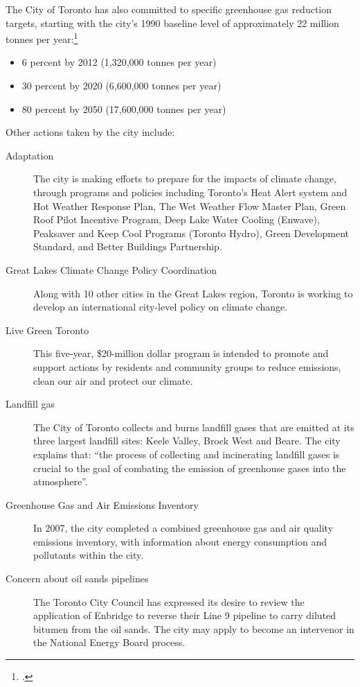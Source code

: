 The City of Toronto has also committed to specific greenhouse gas reduction targets, starting with the city's 1990 baseline level of approximately 22 million tonnes per year:\footcite{TorontoAQandCC}
\begin{itemize}
	\item 6 percent by 2012 (1,320,000 tonnes per year)
	\item 30 percent by 2020 (6,600,000 tonnes per year)
	\item 80 percent by 2050 (17,600,000 tonnes per year)
\end{itemize}



Other actions taken by the city include:
\begin{description}
	\item [Adaptation] The city is making efforts to prepare for the impacts of climate change, through programs and policies including Toronto’s Heat Alert system and Hot Weather Response Plan, The Wet Weather Flow Master Plan, Green Roof Pilot Incentive Program, Deep Lake Water Cooling (Enwave), Peaksaver and Keep Cool Programs (Toronto Hydro), Green Development Standard, and Better Buildings Partnership.
	\item [Great Lakes Climate Change Policy Coordination] Along with 10 other cities in the Great Lakes region, Toronto is working to develop an international city-level policy on climate change.
	\item [Live Green Toronto] This  five-year, \$20-million dollar program is intended to promote and support actions by residents and community groups to reduce emissions, clean our air and protect our climate.
	\item [Landfill gas] The City of Toronto collects and burns landfill gases that are emitted at its three largest landfill sites: Keele Valley, Brock West and Beare. The city explains that: ``the process of collecting and incinerating landfill gases is crucial to the goal of combating the emission of greenhouse gases into the atmosphere''.\cite{TorontoAQandCC}
	\item [Greenhouse Gas and Air Emissions Inventory] In 2007, the city completed a combined greenhouse gas and air quality emissions inventory, with information about energy consumption and pollutants within the city. 
	\item [Concern about oil sands pipelines] The Toronto City Council has expressed its desire to review the application of Enbridge to reverse their Line 9 pipeline to carry diluted bitumen from the oil sands. 
	The city may apply to become an intervenor in the National Energy Board process.
\end{description}




